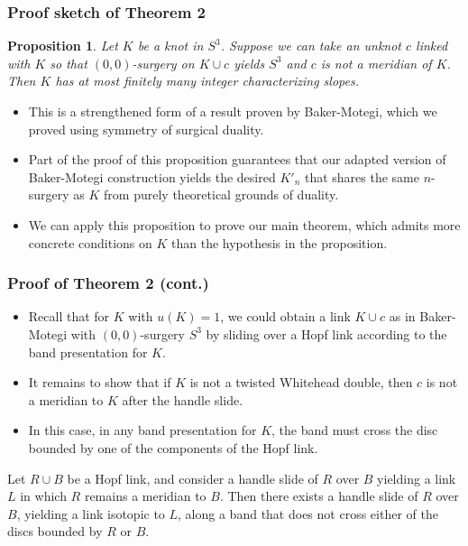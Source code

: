 \documentclass{beamer}
\newtheorem{proposition}[theorem]{Proposition}
\theoremstyle{ex}
\theoremstyle{rem}
\begin{document}
	\begin{frame}
		\frametitle{Proof sketch of Theorem 2}
		\begin{proposition}
			Let $K$ be a knot in $S^3$. Suppose we can take an unknot $c$ linked with $K$ so that $(0,0)$-surgery on $K\cup c$ yields $S^3$ and $c$ is not a meridian of $K$. Then $K$ has at most finitely many integer characterizing slopes.
		\end{proposition}
		\begin{itemize}
			\item This is a strengthened form of a result proven by Baker-Motegi, which we proved using symmetry of surgical duality.
			\item Part of the proof of this proposition guarantees that our adapted version of Baker-Motegi construction yields the desired $K'_n$ that shares the same $n$-surgery as $K$ from purely theoretical grounds of duality.
			\item We can apply this proposition to prove our main theorem, which admits more concrete conditions on $K$ than the hypothesis in the proposition.
		\end{itemize}
	\end{frame}


	\begin{frame}
		\frametitle{Proof of Theorem 2 (cont.)}
		\begin{itemize}
			\item Recall that  for $K$ with $u(K)=1$, we could obtain a link $K\cup c$ as in Baker-Motegi with $(0,0)$-surgery $S^3$ by sliding over a Hopf link according to the band presentation for $K$.
			
			\item It remains to show that if $K$ is not a twisted Whitehead double, then $c$ is not a meridian to $K$ after the handle slide.
			
			\item In this case, in any band presentation for $K$, the band must cross the disc bounded by one of the components of the Hopf link.
			
		\end{itemize}
	
		\begin{lemma}
			Let $R\cup B$ be a Hopf link, and consider a handle slide of $R$ over $B$ yielding a link $L$ in which $R$ remains a meridian to $B$. Then there exists a handle slide of $R$ over $B$, yielding a link isotopic to $L$, along a band that does not cross either of the discs bounded by $R$ or $B$.
		\end{lemma}
	\end{frame}
\end{document}
